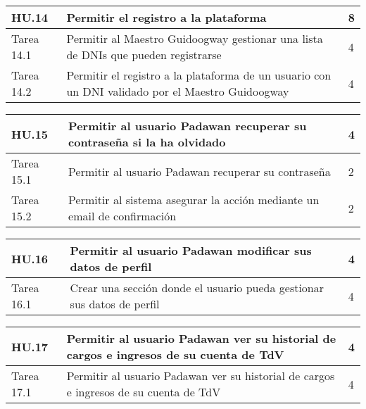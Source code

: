 \begin{table}[h]
	\centering
	\begin{tabular}{| p{2.3cm} | p{6.7cm} | p{2cm} |}
		\rowcolor[HTML]{329A9D} 
		{\color[HTML]{FFFFFF} \textbf{HU.14}} & {\color[HTML]{FFFFFF} \textbf{Permitir el registro a la plataforma}} & {\color[HTML]{FFFFFF} \textbf{8}}  \\ \hline
		Tarea 14.1 & Permitir al Maestro Guidoogway gestionar una lista de DNIs que pueden registrarse & 4 \\ \hline
		Tarea 14.2 & Permitir el registro a la plataforma de un usuario con un DNI validado por el Maestro Guidoogway & 4 \\ \hline
	\end{tabular}
\end{table}

\begin{table}[t]
	\centering
	\begin{tabular}{| p{2.3cm} | p{6.7cm} | p{2cm} |}
		\rowcolor[HTML]{329A9D} 
		{\color[HTML]{FFFFFF} \textbf{HU.15}} & {\color[HTML]{FFFFFF} \textbf{Permitir al usuario Padawan recuperar su contraseña si la ha olvidado}} & {\color[HTML]{FFFFFF} \textbf{4}}  \\ \hline
		Tarea 15.1 & Permitir al usuario Padawan recuperar su contraseña & 2 \\ \hline
		Tarea 15.2 & Permitir al sistema asegurar la acción mediante un email de confirmación & 2 \\ \hline
	\end{tabular}
\end{table}

\begin{table}[t]
	\centering
	\begin{tabular}{| p{2.3cm} | p{6.7cm} | p{2cm} |}
		\rowcolor[HTML]{329A9D} 
		{\color[HTML]{FFFFFF} \textbf{HU.16}} & {\color[HTML]{FFFFFF} \textbf{Permitir al usuario Padawan modificar sus datos de perfil}} & {\color[HTML]{FFFFFF} \textbf{4}}  \\ \hline
		Tarea 16.1 & Crear una sección donde el usuario pueda gestionar sus datos de perfil & 4 \\ \hline
	\end{tabular}
\end{table}

\begin{table}[t]
	\centering
	\begin{tabular}{| p{2.3cm} | p{6.7cm} | p{2cm} |}
		\rowcolor[HTML]{329A9D} 
		{\color[HTML]{FFFFFF} \textbf{HU.17}} & {\color[HTML]{FFFFFF} \textbf{Permitir al usuario Padawan ver su historial de cargos e ingresos de su cuenta de TdV}} & {\color[HTML]{FFFFFF} \textbf{4}}  \\ \hline
		Tarea 17.1 & Permitir al usuario Padawan ver su historial de cargos e ingresos de su cuenta de TdV & 4 \\ \hline
	\end{tabular}
\end{table}

